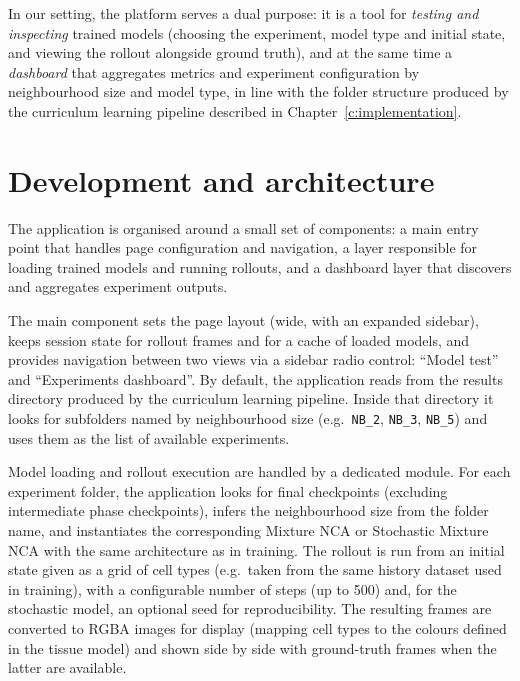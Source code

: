 In our setting, the platform serves a dual purpose: it is a tool for \emph{testing and inspecting} trained models (choosing the experiment, model type and initial state, and viewing the rollout alongside ground truth), and at the same time a \emph{dashboard} that aggregates metrics and experiment configuration by neighbourhood size and model type, in line with the folder structure produced by the curriculum learning pipeline described in Chapter~\ref{c:implementation}.

\section{Development and architecture}

The application is organised around a small set of components: a main entry point that handles page configuration and navigation, a layer responsible for loading trained models and running rollouts, and a dashboard layer that discovers and aggregates experiment outputs.

The main component sets the page layout (wide, with an expanded sidebar), keeps session state for rollout frames and for a cache of loaded models, and provides navigation between two views via a sidebar radio control: ``Model test'' and ``Experiments dashboard''.
By default, the application reads from the results directory produced by the curriculum learning pipeline.
Inside that directory it looks for subfolders named by neighbourhood size (e.g.\ \texttt{NB\_2}, \texttt{NB\_3}, \texttt{NB\_5}) and uses them as the list of available experiments.

Model loading and rollout execution are handled by a dedicated module.
For each experiment folder, the application looks for final checkpoints (excluding intermediate phase checkpoints), infers the neighbourhood size from the folder name, and instantiates the corresponding Mixture NCA or Stochastic Mixture NCA with the same architecture as in training.
The rollout is run from an initial state given as a grid of cell types (e.g.\ taken from the same history dataset used in training), with a configurable number of steps (up to 500) and, for the stochastic model, an optional seed for reproducibility.
The resulting frames are converted to RGBA images for display (mapping cell types to the colours defined in the tissue model) and shown side by side with ground-truth frames when the latter are available.

